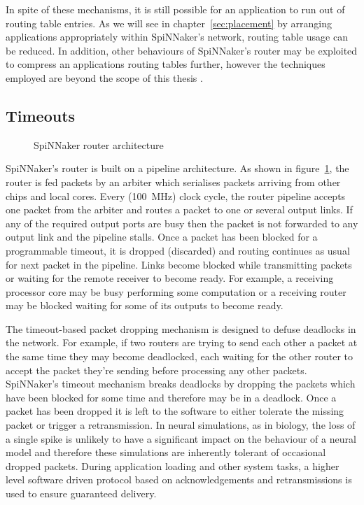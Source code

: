 			In spite of these mechanisms, it is still possible for an application to
			run out of routing table entries. As we will see in
			chapter~\ref{sec:placement} by arranging applications appropriately
			within SpiNNaker's network, routing table usage can be reduced. In
			addition, other behaviours of SpiNNaker's router may be exploited to
			compress an applications routing tables further, however the techniques
			employed are beyond the scope of this thesis \cite{mundy16}.
		
		\subsection{Timeouts}
			
			\begin{figure}
				\center
				
				\caption{SpiNNaker router architecture}
				\label{fig:router-architecture}
			\end{figure}
			
			SpiNNaker's router is built on a pipeline architecture. As shown in
			figure~\ref{fig:router-architecture}, the router is fed packets by an
			arbiter which serialises packets arriving from other chips and local
			cores. Every (\SI{100}{\mega\hertz}) clock cycle, the router pipeline
			accepts one packet from the arbiter and routes a packet to one or several
			output links. If any of the required output ports are busy then the
			packet is not forwarded to any output link and the pipeline stalls. Once
			a packet has been blocked for a programmable timeout, it is dropped
			(discarded) and routing continues as usual for next packet in the
			pipeline. Links become blocked while transmitting packets or waiting for
			the remote receiver to become ready. For example, a receiving processor
			core may be busy performing some computation or a receiving router may be
			blocked waiting for some of its outputs to become ready.
			
			The timeout-based packet dropping mechanism is designed to defuse
			deadlocks in the network. For example, if two routers are trying to send
			each other a packet at the same time they may become deadlocked, each
			waiting for the other router to accept the packet they're sending before
			processing any other packets. SpiNNaker's timeout mechanism breaks
			deadlocks by dropping the packets which have been blocked for some time
			and therefore may be in a deadlock. Once a packet has been dropped it is
			left to the software to either tolerate the missing packet or trigger a
			retransmission. In neural simulations, as in biology, the loss of a
			single spike is unlikely to have a significant impact on the behaviour of
			a neural model and therefore these simulations are inherently tolerant of
			occasional dropped packets. During application loading and other system
			tasks, a higher level software driven protocol based on acknowledgements
			and retransmissions is used to ensure guaranteed delivery.
			

